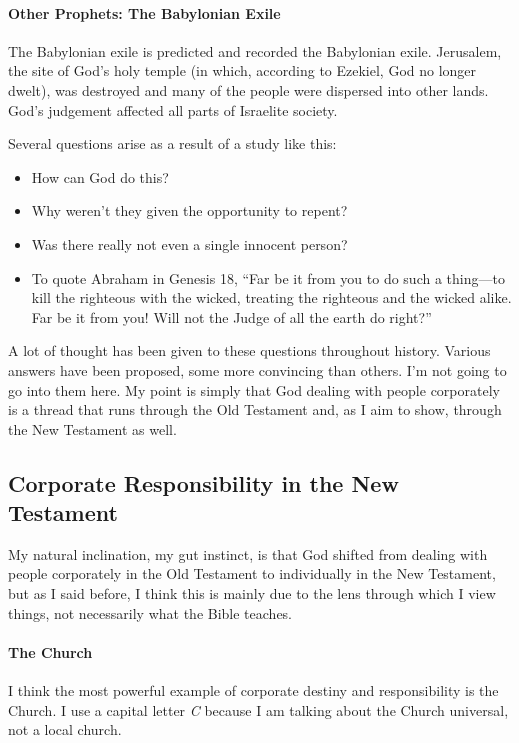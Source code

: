 \paragraph{Other Prophets: The Babylonian Exile} The Babylonian exile is
predicted and recorded the Babylonian exile. Jerusalem, the site of God's holy
temple (in which, according to Ezekiel, God no longer dwelt), was destroyed and
many of the people were dispersed into other lands. God's judgement affected all
parts of Israelite society.

Several questions arise as a result of a study like this:

\begin{itemize}
    \item How can God do this?
    \item Why weren't they given the opportunity to repent?
    \item Was there really not even a single innocent person?
    \item To quote Abraham in Genesis 18, \enquote{Far be it from you to do such
    a thing---to kill the righteous with the wicked, treating the righteous
    and the wicked alike. Far be it from you! Will not the Judge of all the
    earth do right?}
\end{itemize}

A lot of thought has been given to these questions throughout history. Various
answers have been proposed, some more convincing than others. I'm not going to
go into them here. My point is simply that God dealing with people corporately
is a thread that runs through the Old Testament and, as I aim to show, through
the New Testament as well.



\subsection{Corporate Responsibility in the New Testament}

My natural inclination, my gut instinct, is that God shifted from dealing with
people corporately in the Old Testament to individually in the New Testament,
but as I said before, I think this is mainly due to the lens through which I
view things, not necessarily what the Bible teaches.

\paragraph{The Church} I think the most powerful example of corporate destiny
and responsibility is the Church. I use a capital letter \textit{C} because I am
talking about the Church universal, not a local church.

